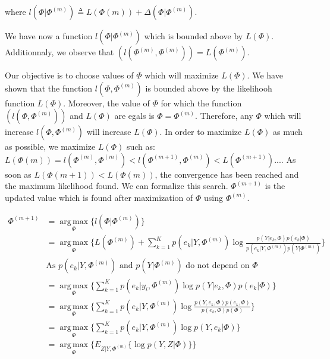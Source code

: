 where $l(\Phi|\Phi^{(m)}) \triangleq  L(\Phi{(m)}) + \Delta(\Phi|\Phi^{(m)})$.\\
\par
We have now a function $l(\Phi|\Phi^{(m)})$ which is bounded above by $L(\Phi)$. Additionnaly, we observe that $(l(\Phi^{(m)},\Phi^{(m)}))=L(\Phi^{(m)})$. \\
\par
Our objective is to choose values of $\Phi$ which will maximize $L(\Phi)$. We have shown that the function $l(\Phi,\Phi^{(m)})$ is bounded above by the likelihooh function $L(\Phi)$. Moreover, the value of $\Phi$ for which the function $(l(\Phi,\Phi^{(m)}))$ and $L(\Phi)$ are egals is $\Phi=\Phi^{(m)}$. Therefore, any $\Phi$ which will increase $l(\Phi,\Phi^{(m)})$ will increase $L(\Phi)$. In order to maximize $L(\Phi)$ as much as possible, we maximize $L(\Phi)$ such as: $L(\Phi{(m)})=l(\Phi^{(m)},\Phi^{(m)})<l(\Phi^{(m+1)},\Phi^{(m)})<L(\Phi^{(m+1)})...$. As soon as $L(\Phi{(m+1)})<L(\Phi{(m)})$, the convergence has been reached and the maximum likelihood found. 
We can formalize this search. $\Phi^{(m+1)}$ is the updated value which is found after maximization of $\Phi$ using $\Phi^{(m)}$. %

  \begin{align}\label{eMF}
  \Phi^{(m+1)} &= \operatorname*{arg\,max}_\Phi \{l(\Phi|\Phi^{(m)})\} \nonumber \\         
             &= \operatorname*{arg\,max}_\Phi \{L(\Phi^{(m)}) + \sum_{k=1}^K   p(e_{k}|Y,\Phi^{(m)})\operatorname*{log} \frac{p(Y|e_{k},\Phi)p(e_{k}|\Phi)}{p(e_{k}|Y,\Phi^{(m)})p(Y|\Phi^{(m)})}\} \nonumber \\
             &\mbox{As $p(e_{k}|Y,\Phi^{(m)})$ and $p(Y|\Phi^{(m)})$ do not depend on $\Phi$} \nonumber \\
             &=\operatorname*{arg\,max}_\Phi \{\sum_{k=1}^K   p(e_{k}|y_i,\Phi^{(m)})\operatorname*{log} p(Y|e_{k},\Phi)p(e_{k}|\Phi) \} \nonumber \\
             &=\operatorname*{arg\,max}_\Phi \{\sum_{k=1}^K   p(e_{k}|Y,\Phi^{(m)})\operatorname*{log} \frac{p(Y,e_{k},\Phi)p(e_{k},\Phi)}{p(e_{k},\Phi)p(\Phi)}\}      \nonumber \\
             &=\operatorname*{arg\,max}_\Phi \{\sum_{k=1}^K   p(e_{k}|Y,\Phi^{(m)})\operatorname*{log} p(Y,e_{k}|\Phi)\} \\
             &=\operatorname*{arg\,max}_\Phi \{ E_{Z|Y,\Phi^{(m)}} \{\operatorname*{log} p(Y,Z|\Phi)\}\} \nonumber
  \end{align}
  
